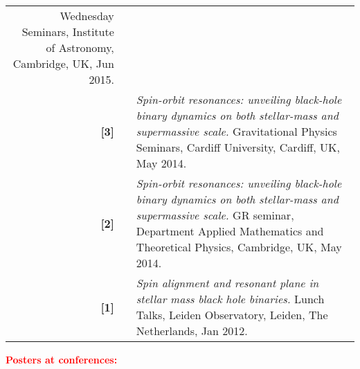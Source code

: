 \documentclass[11pt,a4paper,sans]{moderncv}   %
\begin{document}
{\begin{longtable}{rp{0.3cm}p{15.8cm}}
\newline{} 
Wednesday Seminars, Institute of Astronomy, Cambridge, UK, Jun 2015.\vspace{0.05cm}\\
\textbf{[3]} & & \textit{Spin-orbit resonances: unveiling black-hole binary dynamics on both stellar-mass and supermassive scale.}
\newline{} 
Gravitational Physics Seminars, Cardiff University, Cardiff, UK, May 2014.
\vspace{0.05cm}\\
\textbf{[2]} & & \textit{Spin-orbit resonances: unveiling black-hole binary dynamics on both stellar-mass and supermassive scale.}
\newline{} 
GR seminar, Department Applied Mathematics and Theoretical Physics, Cambridge, UK, May 2014.
\vspace{0.05cm}\\
\textbf{[1]} & & \textit{Spin alignment and resonant plane in stellar mass black hole binaries.}
\newline{} 
Lunch Talks, Leiden Observatory, Leiden, The Netherlands, Jan 2012.
\vspace{0.05cm}\\
\end{longtable}
}


\textcolor{red}{\textbf{Posters at conferences:}}
\end{document}
